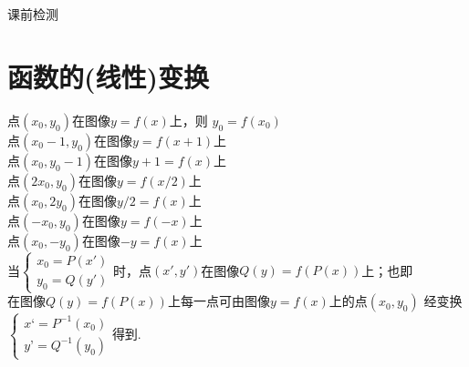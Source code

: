  \newtheorem*{Theorem}{定理}
  \makefront
\vspace{-1.5em}
\startexercise
\begin{exercise}{\heiti 课前检测}\\
\end{exercise}
\section{函数的(线性)变换}
  点$(x_0,y_0)$在图像$y=f(x)$上，则 $y_0=f(x_0)$\\
  点$(x_0-1,y_0)$在图像$y=f(x+1)$上\\
  点$(x_0,y_0-1)$在图像$y+1=f(x)$上\\
  点$(2x_0,y_0)$在图像$y=f(x/2)$上\\
  点$(x_0,2y_0)$在图像$y/2=f(x)$上\\
  点$(-x_0,y_0)$在图像$y=f(-x)$上\\
  点$(x_0,-y_0)$在图像$-y=f(x)$上\\
  当$\begin{cases}
      x_0=P(x')\\
      y_0=Q(y')
    \end{cases}$时，点$(x',y')$在图像$Q(y)=f(P(x))$上；也即\\
  在图像$Q(y)=f(P(x))$上每一点可由图像$y=f(x)$上的点$(x_0,y_0)$
  经变换$\begin{cases}
          x‘=P^{-1}(x_0)\\
          y’=Q^{-1}(y_0)
        \end{cases}$得到.
